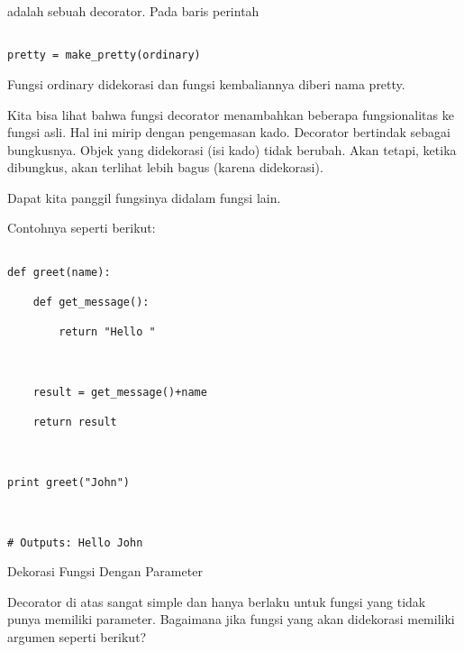 \documentclass[12pt,a4paper]{article}
\begin{document}
adalah sebuah decorator. Pada baris perintah 



\begin{verbatim}

pretty = make_pretty(ordinary)

\end{verbatim}



Fungsi ordinary didekorasi dan fungsi kembaliannya diberi nama pretty.

Kita bisa lihat bahwa fungsi decorator menambahkan beberapa fungsionalitas ke fungsi asli. Hal ini mirip dengan pengemasan kado. Decorator bertindak sebagai bungkusnya. Objek yang didekorasi (isi kado) tidak berubah. Akan tetapi, ketika dibungkus, akan terlihat lebih bagus (karena didekorasi).



Dapat kita panggil fungsinya didalam fungsi lain.

Contohnya seperti berikut:



\begin{verbatim}

def greet(name):

    def get_message():

        return "Hello "



    result = get_message()+name

    return result



print greet("John")



# Outputs: Hello John

\end{verbatim}



Dekorasi Fungsi Dengan Parameter



Decorator di atas sangat simple dan hanya berlaku untuk fungsi yang tidak punya memiliki parameter. Bagaimana jika fungsi yang akan didekorasi memiliki argumen seperti berikut?
\end{document}
